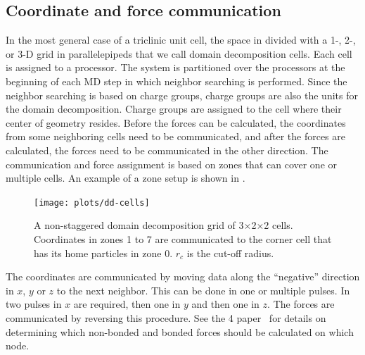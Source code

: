 \subsection{Coordinate and force communication}
In the most general case of a triclinic unit cell,
the space in divided with a 1-, 2-, or 3-D grid in parallelepipeds
that we call domain decomposition cells.
Each cell is assigned to a processor.
The system is partitioned over the processors at the beginning
of each MD step in which neighbor searching is performed.
Since the neighbor searching is based on charge groups, charge groups
are also the units for the domain decomposition.
Charge groups are assigned to the cell where their center of geometry resides.
Before the forces can be calculated, the coordinates from some
neighboring cells need to be communicated,
and after the forces are calculated, the forces need to be communicated
in the other direction.
The communication and force assignment is based on zones that 
can cover one or multiple cells.
An example of a zone setup is shown in .

\begin{figure}
\centerline{\texttt{[image: plots/dd-cells]}}
\caption{
A non-staggered domain decomposition grid of 3$\times$2$\times$2 cells.
Coordinates in zones 1 to 7 are communicated to the corner cell
that has its home particles in zone 0.
$r_c$ is the cut-off radius. 
\label{fig:ddcells}
}
\end{figure}

The coordinates are communicated by moving data along the ``negative''
direction in $x$, $y$ or $z$ to the next neighbor. This can be done in one
or multiple pulses. In  two pulses in $x$ are required,
then one in $y$ and then one in $z$. The forces are communicated by
reversing this procedure. See the {\gromacs} 4 paper~\cite{Hess2008b}
for details on determining which non-bonded and bonded forces
should be calculated on which node.

